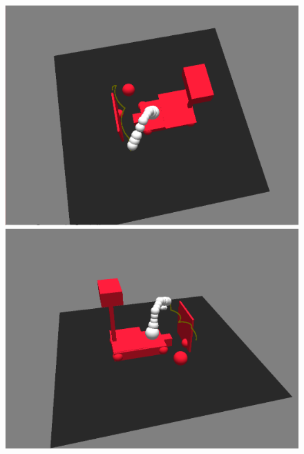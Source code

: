 \documentclass{llncs}
\begin{document}
\begin{figure}[h!]
\begin{center}
\begin{minipage}[b]{0.32\linewidth}
	\begin{center}\includegraphics[angle=0,width=\linewidth]{images/av7.png}\end{center}
\end{minipage}\hfill
\begin{minipage}[b]{0.32\linewidth}
	\begin{center}\includegraphics[angle=0,width=\linewidth]{images/av8.png}\end{center}
\end{minipage}\hfill
\begin{minipage}[b]{0.32\linewidth}

\end{minipage}
\end{center}
\end{figure}
\end{document}
